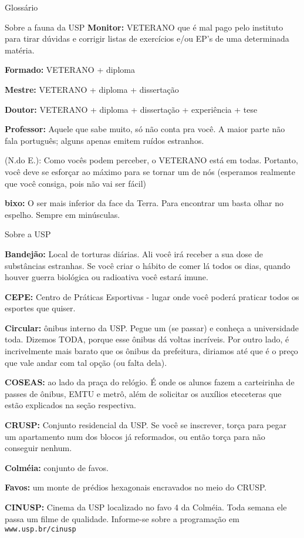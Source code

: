 \begin{secao}{Glossário}
\begin{subsecao}{Sobre a fauna da USP}
{\bf Monitor:} VETERANO que é mal pago pelo instituto para tirar dúvidas e
corrigir listas de exercícios e/ou EP's de uma determinada matéria.

{\bf Formado:} VETERANO + diploma

{\bf Mestre:} VETERANO + diploma + dissertação

{\bf Doutor:} VETERANO + diploma + dissertação + experiência + tese

{\bf Professor:} Aquele que sabe muito, só não conta pra você. A maior parte
não fala português; alguns apenas emitem ruídos estranhos.

(N.do E.): Como vocês podem perceber, o VETERANO está em todas. Portanto, você
deve se esforçar ao máximo para se tornar um de nós (esperamos realmente que
você consiga, pois não vai ser fácil)

{\bf bixo:} O ser mais inferior da face da Terra. Para encontrar um basta olhar
no espelho. Sempre em minúsculas.
\end{subsecao}

\begin{subsecao}{Sobre a USP}

{\bf Bandejão:} Local de torturas diárias. Ali você irá receber a sua dose de
substâncias estranhas. Se você criar o hábito de comer lá todos os dias, quando
houver guerra biológica ou radioativa você estará imune.

{\bf CEPE:} Centro de Práticas Esportivas - lugar onde você poderá praticar
todos os esportes que quiser.

{\bf Circular:} ônibus interno da USP. Pegue um (se passar) e conheça a
universidade toda. Dizemos TODA, porque esse ônibus dá voltas incríveis. Por
outro lado, é incrivelmente mais barato que os ônibus da prefeitura, diriamos
até que é o preço que vale andar com tal opção (ou falta dela).

{\bf COSEAS:} ao lado da praça do relógio. É onde os alunos fazem a carteirinha
de passes de ônibus, EMTU e metrô, além de solicitar os auxílios eteceteras que
estão explicados na seção respectiva.

{\bf CRUSP:} Conjunto residencial da USP. Se você se inscrever, torça para
pegar um apartamento num dos blocos já reformados, ou então torça para não
conseguir nenhum.

{\bf Colméia:} conjunto de favos.

{\bf Favos:} um monte de prédios hexagonais encravados no meio do CRUSP.

{\bf CINUSP:} Cinema da USP localizado no favo 4 da Colméia. Toda semana ele
passa um filme de qualidade. Informe-se sobre a programação em {\tt www.usp.br/cinusp}


\end{subsecao}
\end{secao}
